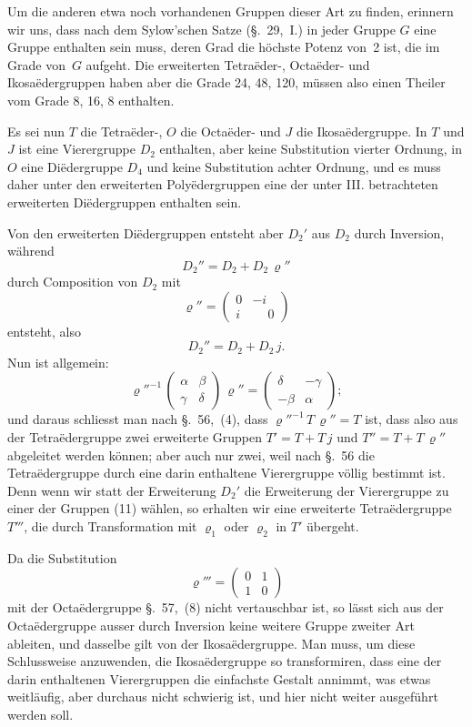 \documentclass[12pt,a4paper]{article}
\begin{document}
Um die anderen etwa noch vorhandenen Gruppen dieser Art zu finden, erinnern wir uns, dass nach dem Sylow'schen Satze (\S.~29,~I.) in jeder Gruppe $G$ eine Gruppe enthalten sein muss, deren Grad die höchste Potenz von~2 ist, die im Grade von~$G$ aufgeht. Die erweiterten Tetraëder-, Octaëder- und Ikosaëdergruppen haben aber die Grade 24, 48, 120, müssen also einen Theiler vom Grade 8, 16, 8 enthalten.

Es sei nun $T$ die Tetraëder-, $O$ die Octaëder- und $J$ die Ikosaëdergruppe. In $T$ und $J$ ist eine Vierergruppe $D_{2}$ enthalten, aber keine Substitution vierter Ordnung, in $O$ eine Diëdergruppe $D_{4}$ und keine Substitution achter Ordnung, und es muss daher unter den erweiterten Polyëdergruppen eine der unter III. betrachteten erweiterten Diëdergruppen enthalten sein.

Von den erweiterten Diëdergruppen entsteht aber $D_{2}'$ aus $D_{2}$ durch Inversion, während
\[
D_{2}'' = D_{2} + D_{2}\,\varrho''
\]
durch Composition von $D_{2}$ mit
\[
\varrho'' = \begin{pmatrix}0&-i\\i&\phantom{-}0\end{pmatrix}
\]
entsteht, also
\[
D_{2}'' = D_{2} + D_{2}\,j.
\]
Nun ist allgemein:
\[
\varrho''^{-1}\,\begin{pmatrix}\alpha&\beta\\\gamma&\delta\end{pmatrix}\,\varrho''
= \begin{pmatrix}\delta&-\gamma\\-\beta&\alpha\end{pmatrix};
\]
und daraus schliesst man nach \S.~56,~(4), dass $\varrho''^{-1}\,T\,\varrho'' = T$ ist, dass also aus der Tetraëdergruppe zwei erweiterte Gruppen $T' = T + T\,j$ und $T'' = T + T\,\varrho''$ abgeleitet werden können; aber auch nur zwei, weil nach \S.~56 die Tetraëdergruppe durch eine darin enthaltene Vierergruppe völlig bestimmt ist. Denn wenn wir statt der Erweiterung $D_{2}'$ die Erweiterung der Vierergruppe zu einer der Gruppen (11) wählen, so erhalten wir eine erweiterte Tetraëdergruppe $T'''$, die durch Transformation mit $\varrho_{1}$ oder $\varrho_{2}$ in $T'$ übergeht.

Da die Substitution
\[
\varrho''' = \begin{pmatrix}0&1\\1&0\end{pmatrix}
\]
mit der Octaëdergruppe \S.~57,~(8) nicht vertauschbar ist, so lässt sich aus der Octaëdergruppe ausser durch Inversion keine weitere Gruppe zweiter Art ableiten, und dasselbe gilt von der Ikosaëdergruppe. Man muss, um diese Schlussweise anzuwenden, die Ikosaëdergruppe so transformiren, dass eine der darin enthaltenen Vierergruppen die einfachste Gestalt annimmt, was etwas weitläufig, aber durchaus nicht schwierig ist, und hier nicht weiter ausgeführt werden soll.
\end{document}
